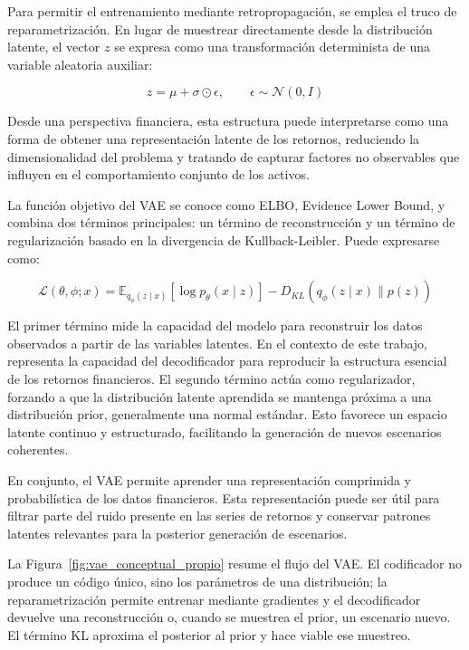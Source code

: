 Para permitir el entrenamiento mediante retropropagación, se emplea el truco de reparametrización. En lugar de muestrear directamente desde la distribución latente, el vector $z$ se expresa como una transformación determinista de una variable aleatoria auxiliar:

\begin{equation}
z = \mu + \sigma \odot \epsilon,
\qquad \epsilon \sim \mathcal{N}(0,I)
\end{equation}

Desde una perspectiva financiera, esta estructura puede interpretarse como una forma de obtener una representación latente de los retornos, reduciendo la dimensionalidad del problema y tratando de capturar factores no observables que influyen en el comportamiento conjunto de los activos.

La función objetivo del VAE se conoce como ELBO, Evidence Lower Bound, y combina dos términos principales: un término de reconstrucción y un término de regularización basado en la divergencia de Kullback-Leibler. Puede expresarse como:

\begin{equation}
\mathcal{L}(\theta,\phi;x)
=
\mathbb{E}_{q_{\phi}(z \mid x)}
\left[
\log p_{\theta}(x \mid z)
\right]
-
D_{KL}
\left(
q_{\phi}(z \mid x)
\parallel
p(z)
\right)
\end{equation}

El primer término mide la capacidad del modelo para reconstruir los datos observados a partir de las variables latentes. En el contexto de este trabajo, representa la capacidad del decodificador para reproducir la estructura esencial de los retornos financieros. El segundo término actúa como regularizador, forzando a que la distribución latente aprendida se mantenga próxima a una distribución prior, generalmente una normal estándar. Esto favorece un espacio latente continuo y estructurado, facilitando la generación de nuevos escenarios coherentes.

En conjunto, el VAE permite aprender una representación comprimida y probabilística de los datos financieros. Esta representación puede ser útil para filtrar parte del ruido presente en las series de retornos y conservar patrones latentes relevantes para la posterior generación de escenarios.

La Figura~\ref{fig:vae_conceptual_propio} resume el flujo del VAE. El codificador no produce un código único, sino los parámetros de una distribución; la reparametrización permite entrenar mediante gradientes y el decodificador devuelve una reconstrucción o, cuando se muestrea el prior, un escenario nuevo. El término KL aproxima el posterior al prior y hace viable ese muestreo.

